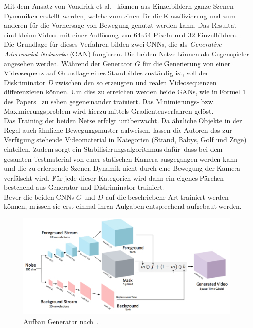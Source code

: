\documentclass[times, 11pt,twocolumn]{article}
\begin{document}
 \label{sec:Vondrick}
Mit dem Ansatz von Vondrick et al.~\cite{VondrickPT16} können aus Einzelbildern ganze Szenen Dynamiken erstellt werden, welche zum einen für die Klassifizierung und zum anderen für die Vorhersage von Bewegung genutzt werden kann. Das Resultat sind kleine Videos mit einer Auflösung von 64x64 Pixeln und 32 Einzelbildern. \\
Die Grundlage für dieses Verfahren bilden zwei CNNs, die als \textit{Generative Adversarial Networks} (GAN) \cite{NIPS2014_5423} fungieren. Die beiden Netze können als Gegenspieler angesehen werden. Während der Generator $G$ für die Generierung von einer Videosequenz auf Grundlage eines Standbildes zuständig ist, soll der Diskriminator $D$ zwischen den so erzeugten und realen Videosequenzen differenzieren können. Um dies zu erreichen werden beide GANs, wie in Formel 1 des Papers~\cite{VondrickPT16} zu sehen gegeneinander trainiert. Das Minimierungs- bzw. Maximierungsproblem wird hierzu mittels Gradientenverfahren gelöst. \\
Das Training der beiden Netze erfolgt unüberwacht. Da ähnliche Objekte in der Regel auch ähnliche Bewegungsmuster aufweisen, lassen die Autoren das zur Verfügung stehende Videomaterial in Kategorien (Strand, Babys, Golf und Züge) einteilen. Zudem sorgt ein Stabilisierungsalgorithmus dafür, dass bei dem gesamten Testmaterial von einer statischen Kamera ausgegangen werden kann und die zu erlernende Szenen Dynamik nicht durch eine Bewegung der Kamera verfälscht wird. Für jede dieser Kategorien wird dann ein eigenes Pärchen bestehend aus Generator und Diskriminator trainiert. \\
Bevor die beiden CNNs $G$ und $D$ auf die beschriebene Art trainiert werden können, müssen sie erst einmal ihren Aufgaben entsprechend aufgebaut werden. \\
\begin{figure}
	\flushleft
	\includegraphics[width=\columnwidth]{Bilder/generator2.jpg}
	\caption{Aufbau Generator nach~\cite{VondrickPT16}.}
	\label{fig:generator}
\end{figure}
\end{document}
